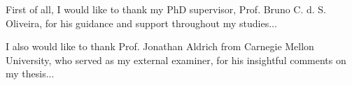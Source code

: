 First of all, I would like to thank my PhD supervisor, Prof. Bruno C. d. S.
Oliveira, for his guidance and support throughout my studies...

I also would like to thank Prof. Jonathan Aldrich from Carnegie Mellon
University, who served as my external examiner, for his insightful comments on
my thesis...
